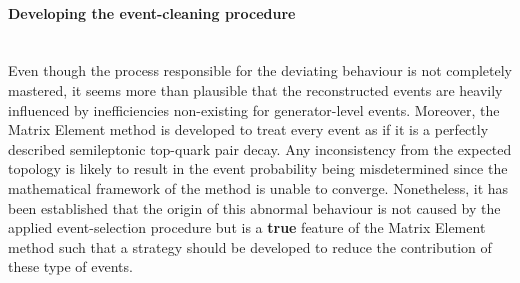 
\paragraph{Developing the event-cleaning procedure} \hfill \\

Even though the process responsible for the deviating behaviour is not completely mastered, it seems more than plausible that the reconstructed events are heavily influenced by inefficiencies non-existing for generator-level events. Moreover, the Matrix Element method is developed to treat every event as if it is a perfectly described semileptonic top-quark pair decay. Any inconsistency from the expected topology is likely to result in the event probability being misdetermined since the mathematical framework of the method is unable to converge.
Nonetheless, it has been established that the origin of this abnormal behaviour is not caused by the applied event-selection procedure but is a \textbf{true} feature of the Matrix Element method such that a strategy should be developed to reduce the contribution of these type of events.
\\

